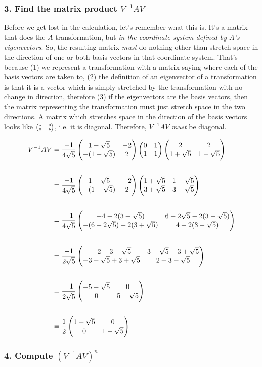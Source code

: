\subsubsection{3. Find the matrix product $V^{-1}AV$}

Before we get lost in the calculation, let's remember what this is. It's a
matrix that does the $A$ transformation, but \textit{in the coordinate system defined
by $A$'s eigenvectors}. So, the resulting matrix \textit{must} do nothing other than
stretch space in the direction of one or both basis vectors in that coordinate
system. That's because (1) we represent a transformation with a matrix saying
where each of the basis vectors are taken to, (2) the definition of an
eigenvector of a transformation is that it is a vector which is simply
stretched by the transformation with no change in direction, therefore (3) if
the eigenvectors are the basis vectors, then the matrix representing the
transformation must just stretch space in the two directions. A matrix which
stretches space in the direction of the basis vectors looks like
$\tiny{\begin{pmatrix}a & 0\\0 & b\\ \end{pmatrix}}$, i.e. it is diagonal. Therefore, $V^{-1}AV$ \textit{must} be
diagonal.

\begin{align*}
V^{-1}AV &=
\frac{-1}{4\sqrt 5}
\begin{pmatrix}1 - \sqrt 5  & -2\\-(1 + \sqrt 5) & 2\\ \end{pmatrix}
\begin{pmatrix}0 & 1\\1 & 1\\ \end{pmatrix}
\begin{pmatrix}2           & 2          \\1 + \sqrt 5 & 1 - \sqrt 5\\ \end{pmatrix}
\\\\
&=
\frac{-1}{4\sqrt 5}
\begin{pmatrix}1 - \sqrt 5  & -2\\-(1 + \sqrt 5) & 2\\ \end{pmatrix}
\begin{pmatrix}1 + \sqrt 5 & 1 - \sqrt 5\\3 + \sqrt 5 & 3 - \sqrt 5\\ \end{pmatrix}
\\\\
&=
\frac{-1}{4\sqrt 5}
\begin{pmatrix}-4 - 2(3 + \sqrt 5)              & 6 - 2\sqrt 5 - 2(3 - \sqrt 5)\\-(6 + 2\sqrt 5) + 2(3 + \sqrt 5) & 4 + 2(3 - \sqrt 5)\\ \end{pmatrix}
\\\\
&=
\frac{-1}{2\sqrt 5}
\begin{pmatrix}-2 - 3 - \sqrt 5 & 3 - \sqrt 5 - 3 + \sqrt 5\\-3 - \sqrt 5 + 3 + \sqrt 5 & 2 + 3 - \sqrt 5\\ \end{pmatrix}
\\\\
&=
\frac{-1}{2\sqrt 5}
\begin{pmatrix}-5 - \sqrt 5 & 0          \\0            & 5 - \sqrt 5\\ \end{pmatrix}
\\\\
&=
\frac{1}{2}
\begin{pmatrix}1 + \sqrt 5 & 0          \\0           & 1 - \sqrt 5\\ \end{pmatrix}
\end{align*}

\subsubsection{4. Compute $(V^{-1}AV)^n$}

